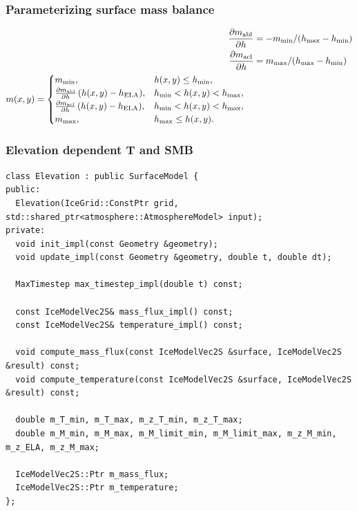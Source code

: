 \documentclass[hide notes,intlimits]{beamer}
\newcommand{\diff}[2]{\frac{\partial #1}{\partial #2}}
\begin{document}
 \begin{frame}
  \frametitle{Parameterizing surface mass balance}
  \begin{align*}
    \diff{\m{abl}}{h} &= -\m{min} / (\h{max} - \h{min})\\
    \diff{\m{acl}}{h} &= \m{max} / (\h{max} - \h{min})\\
    \begin{split}m(x,y) &=
      \begin{cases}
        \m{min}, & h(x,y) \le \h{min}, \\
        \diff{\m{abl}}{h} \, (h(x,y) - h_{\text{ELA}}), &  \h{min} < h(x,y) < \h{max}, \\
        \diff{\m{acl}}{h} \, (h(x,y) - h_{\text{ELA}}), & \h{min} < h(x,y) < \h{max}, \\
        \m{max}, & \h{max} \le h(x,y).
      \end{cases}\end{split}
  \end{align*}
\end{frame}

\begin{frame}[fragile]
  \frametitle{Elevation dependent T and SMB}
\begin{lstlisting}
class Elevation : public SurfaceModel {
public:
  Elevation(IceGrid::ConstPtr grid, std::shared_ptr<atmosphere::AtmosphereModel> input);
private:
  void init_impl(const Geometry &geometry);
  void update_impl(const Geometry &geometry, double t, double dt);

  MaxTimestep max_timestep_impl(double t) const;

  const IceModelVec2S& mass_flux_impl() const;
  const IceModelVec2S& temperature_impl() const;

  void compute_mass_flux(const IceModelVec2S &surface, IceModelVec2S &result) const;
  void compute_temperature(const IceModelVec2S &surface, IceModelVec2S &result) const;

  double m_T_min, m_T_max, m_z_T_min, m_z_T_max;
  double m_M_min, m_M_max, m_M_limit_min, m_M_limit_max, m_z_M_min, m_z_ELA, m_z_M_max;

  IceModelVec2S::Ptr m_mass_flux;
  IceModelVec2S::Ptr m_temperature;
};
\end{lstlisting}
\end{frame}
\end{document}
